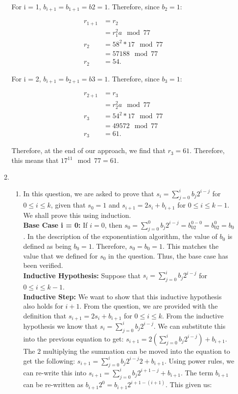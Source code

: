 \documentclass[11pt]{article}
\theoremstyle{definition}
\begin{document}
\begin{enumerate}
\begin{enumerate}
For i = 1, $b_{i+1} = b_{1+1} = b{2} = 1$. Therefore, since $b_2 = 1$:

\begin{align*}
    r_{1+1} &= r_2 \\
    &= r_1^2a \mod{77} \\
    r_2 &= 58^2*17 \mod{77} \\
    &= 57188 \mod{77} \\
    r_2 &= 54.
\end{align*}

For i = 2, $b_{i+1} = b_{2+1} = b{3} = 1$. Therefore, since $b_3 = 1$:

\begin{align*}
    r_{2+1} &= r_3 \\
    &= r_2^2a \mod{77} \\
    r_3 &= 54^2*17 \mod{77} \\ 
    &= 49572 \mod{77} \\
    r_3 &= 61.
\end{align*}

Therefore, at the end of our approach, we find that $r_3 = 61$. Therefore, this means that $17^{11} \mod{77} = 61$.

\item
\begin{enumerate}
\item In this question, we are asked to prove that $s_i = \sum_{j=0}^i b_j2^{i-j}$ for $0 \leq i \leq k$, given that $s_0 = 1$ and $s_{i+1} = 2s_i + b_{i+1}$ for $0 \leq i \leq k - 1$. We shall prove this using induction. \\

\textbf{Base Case i = 0:} If $i = 0$, then $s_0 = \sum_{j=0}^{0} b_j2^{i-j} = b_02^{0 - 0} = b_02^0 = b_0$. In the description of the exponentiation algorithm, the value of $b_0$ is defined as being $b_0 = 1$. Therefore, $s_0 = b_0 = 1$. This matches the value that we defined for $s_0$ in the question. Thus, the base case has been verified.\\

\textbf{Inductive Hypothesis:} Suppose that $s_i = \sum_{j=0}^i b_j2^{i-j}$ for $0 \leq i \leq k - 1$. \\

\textbf{Inductive Step:} We want to show that this inductive hypothesis also holds for $i+1$. From the question, we are provided with the definition that $s_{i+1} = 2s_i + b_{i+1}$ for $0 \leq i \leq k$. From the inductive hypothesis we know that $s_i = \sum_{j=0}^i b_j2^{i-j}$. We can substitute this into the previous equation to get: $s_{i+1} = 2(\sum_{j=0}^i b_j2^{i-j}) + b_{i+1}$. The $2$ multiplying the summation can be moved into the equation to get the following: $s_{i+1} = \sum_{j=0}^i b_j2^{i-j}2 + b_{i+1}$. Using power rules, we can re-write this into $s_{i+1} = \sum_{j=0}^i b_j2^{i+1-j} + b_{i+1}$. The term $b_{i+1}$ can be re-written as $b_{i+1}2^0 = b_{i+1}2^{i+1-(i+1)}$. This given us:


\end{enumerate}
\end{enumerate}
\end{enumerate}
\end{document}
